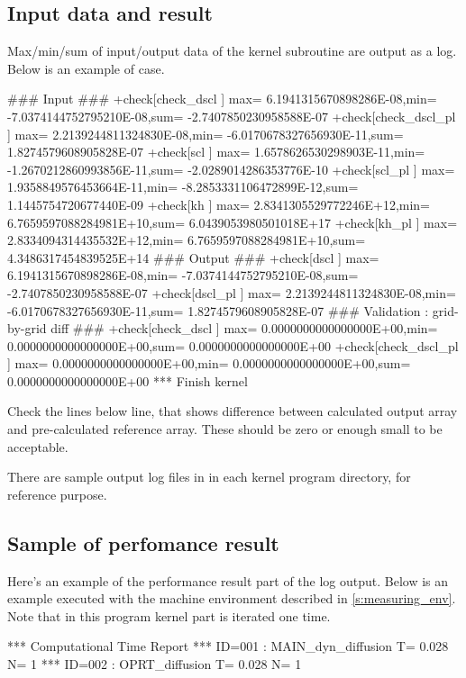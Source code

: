 \subsection{Input data and result}

Max/min/sum of input/output data of the kernel subroutine are output as
a log.
%
Below is an example of  case.


\begin{LstLog}
 ### Input ###
 +check[check_dscl      ] max=  6.1941315670898286E-08,min= -7.0374144752795210E-08,sum= -2.7407850230958588E-07
 +check[check_dscl_pl   ] max=  2.2139244811324830E-08,min= -6.0170678327656930E-11,sum=  1.8274579608905828E-07
 +check[scl             ] max=  1.6578626530298903E-11,min= -1.2670212860993856E-11,sum= -2.0289014286353776E-10
 +check[scl_pl          ] max=  1.9358849576453664E-11,min= -8.2853331106472899E-12,sum=  1.1445754720677440E-09
 +check[kh              ] max=  2.8341305529772246E+12,min=  6.7659597088284981E+10,sum=  6.0439053980501018E+17
 +check[kh_pl           ] max=  2.8334094314435532E+12,min=  6.7659597088284981E+10,sum=  4.3486317454839525E+14
 ### Output ###
 +check[dscl            ] max=  6.1941315670898286E-08,min= -7.0374144752795210E-08,sum= -2.7407850230958588E-07
 +check[dscl_pl         ] max=  2.2139244811324830E-08,min= -6.0170678327656930E-11,sum=  1.8274579608905828E-07
 ### Validation : grid-by-grid diff ###
 +check[check_dscl      ] max=  0.0000000000000000E+00,min=  0.0000000000000000E+00,sum=  0.0000000000000000E+00
 +check[check_dscl_pl   ] max=  0.0000000000000000E+00,min=  0.0000000000000000E+00,sum=  0.0000000000000000E+00
 *** Finish kernel
\end{LstLog}

Check the lines below  line,
that shows difference between calculated output array and
pre-calculated reference array.
These should be zero or enough small to be acceptable.

There are sample output log files in 
in each kernel program directory, for reference purpose.


\subsection{Sample of perfomance result}

Here's an example of the performance result part of the log output.
Below is an example executed with the machine environment described in \autoref{s:measuring_env}.
%
Note that in this program kernel part is iterated one time.

\begin{LstLog}
 *** Computational Time Report
 *** ID=001 : MAIN_dyn_diffusion               T=     0.028 N=      1
 *** ID=002 : OPRT_diffusion                   T=     0.028 N=      1
\end{LstLog}

